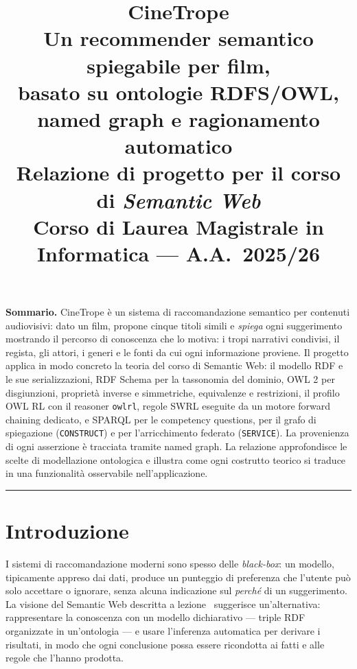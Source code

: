 \documentclass[a4paper,11pt]{article}
\title{\textbf{CineTrope}\\[4pt]
\Large Un recommender semantico spiegabile per film,\\
basato su ontologie RDFS/OWL, named graph e ragionamento automatico\\[10pt]
\normalsize Relazione di progetto per il corso di \emph{Semantic Web}\\
Corso di Laurea Magistrale in Informatica --- A.A.\ 2025/26}
\author{}
\date{}
\newcommand{\code}[1]{\texttt{#1}}
\begin{document}
\maketitle
\thispagestyle{empty}
\vspace{1.2cm}
\begin{center}
\begin{minipage}{0.86\textwidth}
\small
\textbf{Sommario.} 
CineTrope \`e un sistema di raccomandazione semantico per contenuti audiovisivi:
dato un film, propone cinque titoli simili e \emph{spiega} ogni suggerimento
mostrando il percorso di conoscenza che lo motiva: i tropi narrativi condivisi,
il regista, gli attori, i generi e le fonti da cui ogni informazione proviene.
Il progetto applica in modo concreto la teoria del corso di Semantic Web:
il modello RDF e le sue serializzazioni, RDF Schema per la tassonomia del
dominio, OWL 2 per disgiunzioni, propriet\`a inverse e simmetriche, equivalenze
e restrizioni, il profilo OWL RL con il reasoner \code{owlrl}, regole SWRL
eseguite da un motore forward chaining dedicato, e SPARQL per le competency
questions, per il grafo di spiegazione (\code{CONSTRUCT}) e per
l'arricchimento federato (\code{SERVICE}). La provenienza di ogni asserzione
\`e tracciata tramite named graph. La relazione approfondisce le scelte di
modellazione ontologica e illustra come ogni costrutto teorico si traduce in
una funzionalit\`a osservabile nell'applicazione.
\end{minipage}
\end{center}

\vfill
\begin{center}
\rule{0.5\textwidth}{0.4pt}
\end{center}
\newpage

\tableofcontents
\newpage

\section{Introduzione}

I sistemi di raccomandazione moderni sono spesso delle \emph{black-box}: un
modello, tipicamente appreso dai dati, produce un punteggio di preferenza che
l'utente pu\`o solo accettare o ignorare, senza alcuna indicazione sul
\emph{perch\'e} di un suggerimento. La visione del Semantic Web descritta a
lezione~\cite{allemang2020,antoniou2012} suggerisce un'alternativa:
rappresentare la conoscenza con un modello dichiarativo --- triple RDF
organizzate in un'ontologia --- e usare l'inferenza automatica per derivare i
risultati, in modo che ogni conclusione possa essere ricondotta ai fatti e
alle regole che l'hanno prodotta.
\end{document}
